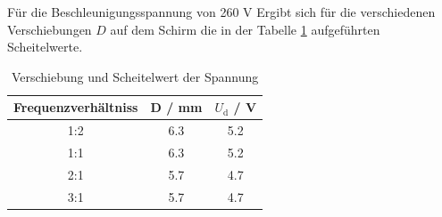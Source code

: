 Für die Beschleunigungsspannung von 260 V Ergibt sich für die verschiedenen Verschiebungen $D$ auf dem Schirm die in der Tabelle \ref{tab:scheitel} aufgeführten Scheitelwerte.
\begin{table}
  \centering
  \begin{tabular}{c c c}
    \toprule
	Frequenzverhältniss & D / mm & $U_\text{d}$ / V \\
    \midrule
	1:2	& 6.3 & 5.2 	\\
	1:1	& 6.3 & 5.2	\\
	2:1	& 5.7 & 4.7	\\
	3:1	& 5.7 & 4.7	\\
    \bottomrule
  \end{tabular}
  \caption{Verschiebung und Scheitelwert der Spannung}
  \label{tab:scheitel}
\end{table}
